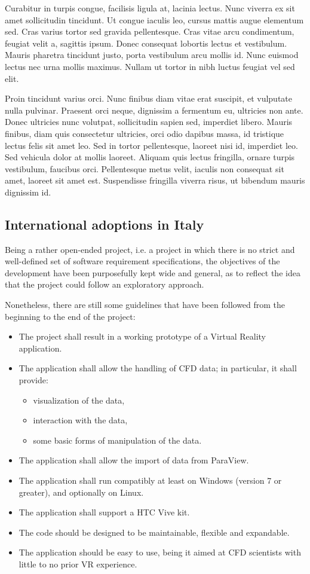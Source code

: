 Curabitur in turpis congue, facilisis ligula at, lacinia lectus. Nunc viverra ex sit amet sollicitudin tincidunt. Ut congue iaculis leo, cursus mattis augue elementum sed. Cras varius tortor sed gravida pellentesque. Cras vitae arcu condimentum, feugiat velit a, sagittis ipsum. Donec consequat lobortis lectus et vestibulum. Mauris pharetra tincidunt justo, porta vestibulum arcu mollis id. Nunc euismod lectus nec urna mollis maximus. Nullam ut tortor in nibh luctus feugiat vel sed elit.

Proin tincidunt varius orci. Nunc finibus diam vitae erat suscipit, et vulputate nulla pulvinar. Praesent orci neque, dignissim a fermentum eu, ultricies non ante. Donec ultricies nunc volutpat, sollicitudin sapien sed, imperdiet libero. Mauris finibus, diam quis consectetur ultricies, orci odio dapibus massa, id tristique lectus felis sit amet leo. Sed in tortor pellentesque, laoreet nisi id, imperdiet leo. Sed vehicula dolor at mollis laoreet. Aliquam quis lectus fringilla, ornare turpis vestibulum, faucibus orci. Pellentesque metus velit, iaculis non consequat sit amet, laoreet sit amet est. Suspendisse fringilla viverra risus, ut bibendum mauris dignissim id.

\subsection{International adoptions in Italy}\label{sub:adoptionsinitaly}
Being a rather open-ended project, i.e. a project in which there is no strict and well-defined set of software requirement specifications, the objectives of the development have been purposefully kept wide and general, as to reflect the idea that the project could follow an exploratory approach.

Nonetheless, there are still some guidelines that have been followed from the beginning to the end of the project:

\begin{itemize}
	\item The project shall result in a working prototype of a Virtual Reality application.
	\item The application shall allow the handling of CFD data; in particular, it shall provide:
	\begin{itemize}
		\item visualization of the data,
		\item interaction with the data,
		\item some basic forms of manipulation of the data.
	\end{itemize}
	\item The application shall allow the import of data from ParaView.
	\item The application shall run compatibly at least on Windows (version 7 or greater), and optionally on Linux.
	\item The application shall support a HTC Vive kit.
	\item The code should be designed to be maintainable, flexible and expandable.
	\item The application should be easy to use, being it aimed at CFD scientists with little to no prior VR experience.
\end{itemize}

